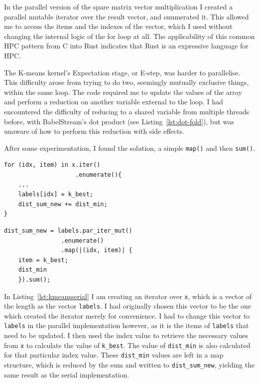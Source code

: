 In the parallel version of the spare matrix vector multiplication I created a parallel mutable iterator over the result vector, and enumerated it. This allowed me to access the items and the indexes of the vector, which I used without changing the internal logic of the for loop at all. The applicability of this common HPC pattern from C into Rust indicates that Rust is an expressive language for HPC.

The K-means kernel's Expectation stage, or E-step, was harder to parallelise. This difficulty arose from trying to do two, seemingly mutually exclusive things, within the same loop. The code required me to update the values of the array and perform a reduction on another variable external to the loop. I had encountered the difficulty of reducing to a shared variable from multiple threads before, with BabelStream's dot product (see Listing~\ref{lst:dot-fold}), but was unaware of how to perform this reduction with side effects.

After some experimentation, I found the solution, a simple \texttt{map()} and then \texttt{sum()}. 

\begin{minipage}{.49\textwidth}
\begin{code}
\begin{verbatim}
for (idx, item) in x.iter()
                    .enumerate(){
    ...
    labels[idx] = k_best;
    dist_sum_new += dist_min;
}
\end{verbatim}
\label{lst:kmeansserial}
\end{code}
\end{minipage}\hfill
\begin{minipage}{.49\textwidth}
\begin{code}
\begin{verbatim}
dist_sum_new = labels.par_iter_mut()
                .enumerate()
                .map(|(idx, item)| {
    item = k_best;
    dist_min
    }).sum();
\end{verbatim}
\label{lst:kmeanspar}
\end{code}
\end{minipage}

In Listing~\ref{lst:kmeansserial} I am creating an iterator over \texttt{x}, which is a vector of the length as the vector \texttt{labels}. I had originally chosen this vector to be the one which created the iterator merely for convenience. I had to change this vector to \texttt{labels} in the parallel implementation however, as it is the items of \texttt{labels} that need to be updated. I then used the index value to retrieve the necessary values from \texttt{x} to calculate the value of \texttt{k\_best}. The value of \texttt{dist\_min} is also calculated for that particular index value. These \texttt{dist\_min} values are left in a map structure, which is reduced by the sum and written to \texttt{dist\_sum\_new}, yielding the same result as the serial implementation. 

